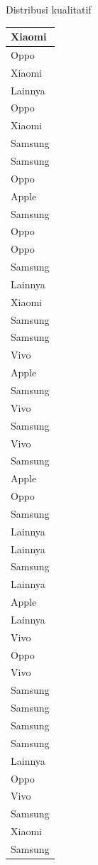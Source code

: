 \documentclass[
  ignorenonframetext,
]{beamer}
\begin{document}
\begin{frame}[s]{Distribusi kualitatif}
\begin{table}
\begin{tabular}[t]{l}
\hline
Xiaomi\\
\hline
Oppo\\
\hline
Xiaomi\\
\hline
Lainnya\\
\hline
Oppo\\
\hline
Xiaomi\\
\hline
Samsung\\
\hline
Samsung\\
\hline
Oppo\\
\hline
Apple\\
\hline
Samsung\\
\hline
Oppo\\
\hline
Oppo\\
\hline
Samsung\\
\hline
Lainnya\\
\hline
Xiaomi\\
\hline
Samsung\\
\hline
Samsung\\
\hline
Vivo\\
\hline
Apple\\
\hline
Samsung\\
\hline
Vivo\\
\hline
Samsung\\
\hline
Vivo\\
\hline
Samsung\\
\hline
Apple\\
\hline
Oppo\\
\hline
Samsung\\
\hline
Lainnya\\
\hline
Lainnya\\
\hline
Samsung\\
\hline
Lainnya\\
\hline
Apple\\
\hline
Lainnya\\
\hline
Vivo\\
\hline
Oppo\\
\hline
Vivo\\
\hline
Samsung\\
\hline
Samsung\\
\hline
Samsung\\
\hline
Samsung\\
\hline
Lainnya\\
\hline
Oppo\\
\hline
Vivo\\
\hline
Samsung\\
\hline
Xiaomi\\
\hline
Samsung\\

\end{tabular}
\end{table}
\end{frame}
\end{document}
